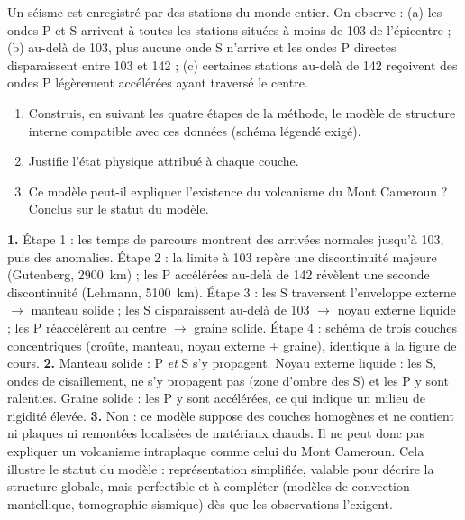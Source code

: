 \documentclass[11pt]{article}
\begin{document}
\begin{exercice}
Un séisme est enregistré par des stations du monde entier. On observe : (a) les ondes P et S arrivent à toutes les stations situées à moins de 103\textdegree{} de l'épicentre ; (b) au-delà de 103\textdegree{}, plus aucune onde S n'arrive et les ondes P directes disparaissent entre 103\textdegree{} et 142\textdegree{} ; (c) certaines stations au-delà de 142\textdegree{} reçoivent des ondes P légèrement accélérées ayant traversé le centre.
\begin{enumerate}
\item Construis, en suivant les quatre étapes de la méthode, le modèle de structure interne compatible avec ces données (schéma légendé exigé).
\item Justifie l'état physique attribué à chaque couche.
\item Ce modèle peut-il expliquer l'existence du volcanisme du Mont Cameroun ? Conclus sur le statut du modèle.
\end{enumerate}
\end{exercice}

\begin{corrige}
\textbf{1.} Étape 1 : les temps de parcours montrent des arrivées normales jusqu'à 103\textdegree{}, puis des anomalies. Étape 2 : la limite à 103\textdegree{} repère une discontinuité majeure (Gutenberg, \SI{2900}{km}) ; les P accélérées au-delà de 142\textdegree{} révèlent une seconde discontinuité (Lehmann, \SI{5100}{km}). Étape 3 : les S traversent l'enveloppe externe $\rightarrow$ manteau solide ; les S disparaissent au-delà de 103\textdegree{} $\rightarrow$ noyau externe liquide ; les P réaccélèrent au centre $\rightarrow$ graine solide. Étape 4 : schéma de trois couches concentriques (croûte, manteau, noyau externe + graine), identique à la figure de cours.
\textbf{2.} Manteau solide : P \emph{et} S s'y propagent. Noyau externe liquide : les S, ondes de cisaillement, ne s'y propagent pas (zone d'ombre des S) et les P y sont ralenties. Graine solide : les P y sont accélérées, ce qui indique un milieu de rigidité élevée.
\textbf{3.} Non : ce modèle suppose des couches homogènes et ne contient ni plaques ni remontées localisées de matériaux chauds. Il ne peut donc pas expliquer un volcanisme intraplaque comme celui du Mont Cameroun. Cela illustre le statut du modèle : représentation simplifiée, valable pour décrire la structure globale, mais perfectible et à compléter (modèles de convection mantellique, tomographie sismique) dès que les observations l'exigent.
\end{corrige}
\end{document}
